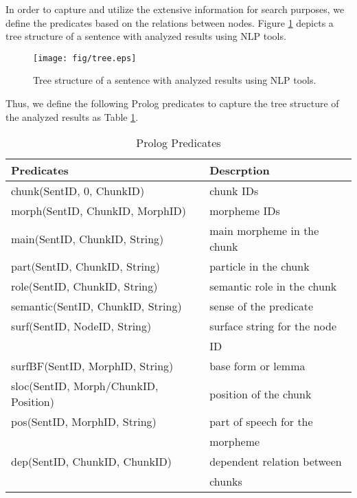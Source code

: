 \documentclass[conference]{IEEEtran}
\begin{document}
In order to capture and utilize the extensive information for search purposes, 
we define the predicates
based on the relations between nodes. Figure \ref{fig:tree} depicts a tree structure of
a sentence with analyzed results using NLP tools. 

\begin{figure}[htbp]
  \centerline{\texttt{[image: fig/tree.eps]}}
  \caption{Tree structure of a sentence with analyzed results using NLP tools.}
  \label{fig:tree}
\end{figure}

Thus, we define the following Prolog predicates to capture the tree structure of
the analyzed results as Table \ref{tbl:predicates}. 

\begin{table}[htbp]
  \caption{Prolog Predicates}
  \begin{center}
    \begin{tabular}{|l|l|}\hline
      Predicates                            & Descrption                  \\\hline
      chunk(SentID, 0, ChunkID)             & chunk IDs                   \\
      morph(SentID, ChunkID, MorphID)       & morpheme IDs                \\
      main(SentID, ChunkID, String)         & main morpheme in the chunk  \\
      part(SentID, ChunkID, String)         & particle in the chunk       \\
      role(SentID, ChunkID, String)         & semantic role in the chunk  \\
      semantic(SentID, ChunkID, String)     & sense of the predicate      \\
      surf(SentID, NodeID, String)          & surface string for the node \\
                                            & ID                          \\
      surfBF(SentID, MorphID, String)       & base form or lemma          \\
      sloc(SentID, Morph/ChunkID, Position) & position of the chunk       \\
      pos(SentID, MorphID, String)          & part of speech for the      \\
                                            & morpheme                    \\
      dep(SentID, ChunkID, ChunkID)         & dependent relation between  \\
                                            & chunks                      \\\hline
    \end{tabular}
    \label{tbl:predicates}
  \end{center}
\end{table}
\end{document}
